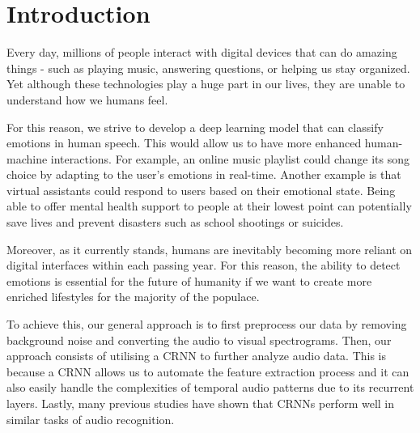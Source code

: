 \documentclass[../main.tex]{subfiles}
\begin{document}
\section{Introduction}
Every day, millions of people interact with digital devices that can do amazing 
things - such as playing music, answering questions, or helping us stay organized. 
Yet although these technologies play a huge part in our lives, they are unable to 
understand how we humans feel. 

For this reason, we strive to develop a deep learning model that can classify 
emotions in human speech. This would allow us to have more enhanced 
human-machine interactions. For example, an online music playlist could 
change its song choice by adapting to the user's emotions in real-time. Another 
example is that virtual assistants could respond to users based on their 
emotional state. Being able to offer mental health support to people at their 
lowest point can potentially save lives and prevent disasters such as school 
shootings or suicides.

Moreover, as it currently stands, humans are inevitably becoming more reliant on 
digital interfaces within each passing year. For this reason, the ability to
detect emotions is essential for the future of humanity if we want to create
more enriched lifestyles for the majority of the populace.

To achieve this, our general approach is to first preprocess our data by removing
background noise and converting the audio to visual spectrograms. Then, our approach
consists of utilising a CRNN to further analyze audio data. This is because a CRNN
allows us to automate the feature extraction process and it can also easily handle
the complexities of temporal audio patterns due to its recurrent layers. Lastly,
many previous studies have shown that CRNNs perform well in similar tasks of audio
recognition.
\end{document}

